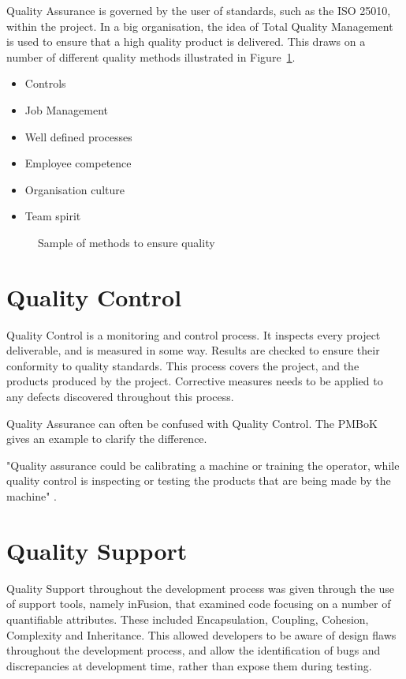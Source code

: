 Quality Assurance is governed by the user of standards, such as the ISO 25010, within the project. In a big organisation, the idea of Total Quality Management is used to ensure that a high quality product is delivered. This draws on a number of different quality methods illustrated in Figure~\ref{fig:qstandards}.

\begin{itemize}
\item Controls
\item Job Management
\item Well defined processes
\item Employee competence
\item Organisation culture
\item Team spirit
\end{itemize}
\begin{figure}[H]
\caption{Sample of methods to ensure quality}
\label{fig:qstandards}
\end{figure}

\section{Quality Control}

Quality Control is a monitoring and control process. It inspects every project deliverable, and is measured in some way. Results are checked to ensure their conformity to quality standards. This process covers the project, and the products produced by the project. Corrective measures needs to be applied to any defects discovered throughout this process.

Quality Assurance can often be confused with Quality Control. The PMBoK gives an example to clarify the difference.

"Quality assurance could be calibrating a machine or training the operator, while quality control is inspecting or testing the products that are being made by the machine" \parencite{pmbok}.

\section{Quality Support}

Quality Support throughout the development process was given through the use of support tools, namely inFusion, that examined code focusing on a number of quantifiable attributes. These included Encapsulation, Coupling, Cohesion, Complexity and Inheritance. This allowed developers to be aware of design flaws throughout the development process, and allow the identification of bugs and discrepancies at development time, rather than expose them during testing. 

